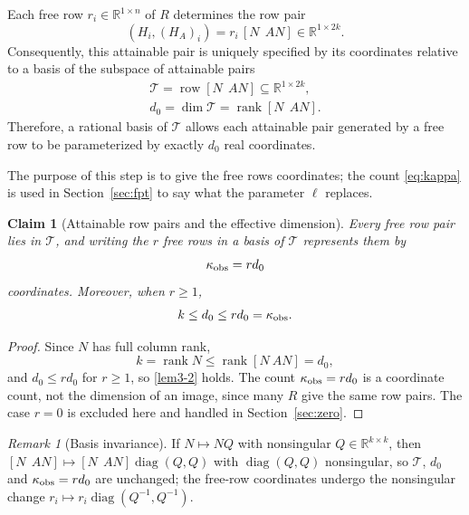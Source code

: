\documentclass[journal]{IEEEtran}
\theoremstyle{plainn}
\newtheorem{claim}{Claim}
\theoremstyle{remark}
\newtheorem{remark}{Remark}
\begin{document}
Each free row $r_i\in\mathbb R^{1\times n}$ of $R$ determines the row pair
\begin{equation*}
(H_i,(H_A)_i)=r_i\,[N\ \ AN] \in\mathbb R^{1\times 2k}.
\end{equation*}
Consequently, this attainable pair is uniquely specified by its coordinates relative to a basis of the subspace of attainable pairs
\begin{equation*}
\begin{gathered}
\mathcal T=\operatorname{row}[N\ \ AN]\subseteq\mathbb R^{1\times 2k},\\
d_0=\dim\mathcal T=\operatorname{rank}[N\ \ AN].
\end{gathered}
\end{equation*}
Therefore, a rational basis of $\mathcal T$ allows each attainable pair generated by a free row to be parameterized by exactly $d_0$ real coordinates.

The purpose of this step is to give the free rows coordinates; the count \eqref{eq:kappa} is used in Section~\ref{sec:fpt} to say what the parameter $\ell$ replaces.

\begin{claim}[Attainable row pairs and the effective dimension]\label{lem:attainable}
Every free row pair lies in $\mathcal T$, and writing the $r$ free rows in a basis of $\mathcal T$ represents them by
\begin{equation}\label{eq:kappa}
\kappa_{\rm obs}=r d_0
\end{equation}
coordinates. Moreover, when $r\ge1$,
\begin{equation}\label{lem3-2}
k\le d_0\le rd_0=\kappa_{\rm obs}.
\end{equation}
\end{claim}

\begin{proof}
Since $N$ has full column rank,
\begin{equation}\label{lem3-1}
k=\operatorname{rank}N\le\operatorname{rank}[N\ AN]=d_0 ,
\end{equation}
and $d_0\le rd_0$ for $r\ge1$, so \eqref{lem3-2} holds. The count $\kappa_{\rm obs}=rd_0$ is a
coordinate count, not the dimension of an image, since many $R$ give the same row pairs. The case
$r=0$ is excluded here and handled in Section~\ref{sec:zero}.
\end{proof}

\begin{remark}[Basis invariance]
If $N\mapsto NQ$ with nonsingular $Q\in\mathbb R^{k\times k}$, then
$[N\ \ AN]\mapsto[N\ \ AN]\operatorname{diag}(Q,Q)$ with $\operatorname{diag}(Q,Q)$ nonsingular, so
$\mathcal T$, $d_0$ and $\kappa_{\rm obs}=rd_0$ are unchanged; the free-row coordinates undergo the
nonsingular change $r_i\mapsto r_i\operatorname{diag}(Q^{-1},Q^{-1})$.
\end{remark}
\end{document}
